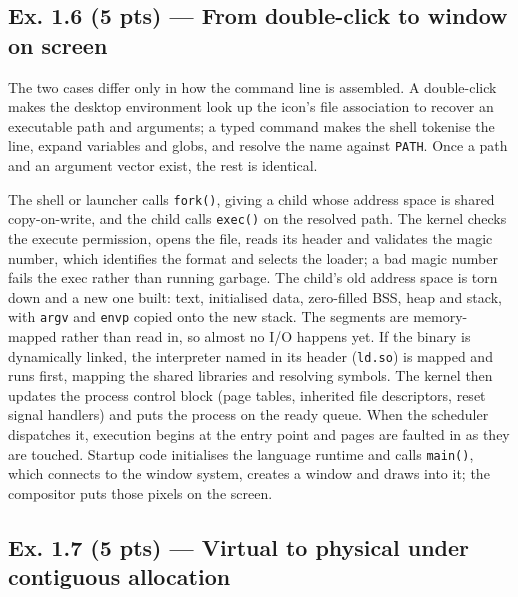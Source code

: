 \subsection*{Ex. 1.6 (5 pts) --- From double-click to window on screen}
\label{p2:sec:launch}

The two cases differ only in how the command line is assembled. A double-click makes
the desktop environment look up the icon's file association to recover an executable
path and arguments; a typed command makes the shell tokenise the line, expand variables
and globs, and resolve the name against \texttt{PATH}. Once a path and an argument
vector exist, the rest is identical.

The shell or launcher calls \texttt{fork()}, giving a child whose address space is
shared copy-on-write, and the child calls \texttt{exec()} on the resolved path. The
kernel checks the execute permission, opens the file, reads its header and validates
the magic number, which identifies the format and selects the loader; a bad magic
number fails the exec rather than running garbage. The child's old address space is
torn down and a new one built: text, initialised data, zero-filled BSS, heap and stack,
with \texttt{argv} and \texttt{envp} copied onto the new stack. The segments are
memory-mapped rather than read in, so almost no I/O happens yet. If the binary is
dynamically linked, the interpreter named in its header (\texttt{ld.so}) is mapped and
runs first, mapping the shared libraries and resolving symbols. The kernel then updates
the process control block (page tables, inherited file descriptors, reset signal
handlers) and puts the process on the ready queue. When the scheduler dispatches it,
execution begins at the entry point and pages are faulted in as they are touched.
Startup code initialises the language runtime and calls \texttt{main()}, which connects
to the window system, creates a window and draws into it; the compositor puts those
pixels on the screen.


\subsection*{Ex. 1.7 (5 pts) --- Virtual to physical under contiguous allocation}
\label{p2:sec:translate}


